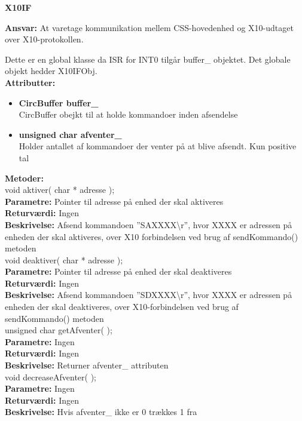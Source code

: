 %
%
{\centering
\textbf{X10IF}\par
}
\textbf{Ansvar:} At varetage kommunikation mellem CSS-hovedenhed og X10-udtaget over X10-protokollen.

Dette er en global klasse da ISR for INT0 tilgår buffer\_ objektet. Det globale objekt hedder X10IFObj. \\
\textbf{Attributter:}
\begin{itemize}
	\item \textbf{CircBuffer buffer\_} \\
	CircBuffer obejkt til at holde kommandoer inden afsendelse
	\item \textbf{unsigned char afventer\_} \\
	Holder antallet af kommandoer der venter på at blive afsendt. Kun positive tal
\end{itemize}
\textbf{Metoder:} \\
void aktiver( char * adresse ); \\
\textbf{Parametre:} Pointer til adresse på enhed der skal aktiveres \\
\textbf{Returværdi:} Ingen \\
\textbf{Beskrivelse:} Afsend kommandoen ''SAXXXX\textbackslash r'', hvor XXXX er adressen på enheden der skal aktiveres, over X10 forbindelsen ved brug af sendKommando() metoden \\

void deaktiver( char * adresse ); \\
\textbf{Parametre:} Pointer til adresse på enhed der skal deaktiveres \\
\textbf{Returværdi:} Ingen \\
\textbf{Beskrivelse:} Afsend kommandoen ''SDXXXX\textbackslash r'', hvor XXXX er adressen på enheden der skal deaktiveres, over X10-forbindelsen ved brug af sendKommando() metoden \\

unsigned char getAfventer( ); \\
\textbf{Parametre:} Ingen \\
\textbf{Returværdi:} Ingen \\
\textbf{Beskrivelse:} Returner afventer\_ attributen \\

void decreaseAfventer( ); \\
\textbf{Parametre:} Ingen \\
\textbf{Returværdi:} Ingen \\
\textbf{Beskrivelse:} Hvis afventer\_ ikke er 0 trækkes 1 fra \\

